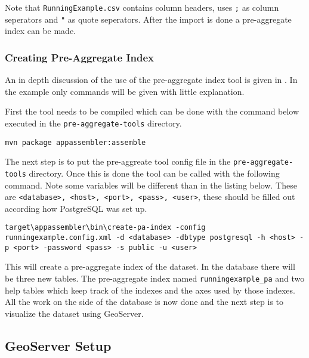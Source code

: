 Note that \lstinline|RunningExample.csv| contains column headers, uses \lstinline|;| as column seperators and \lstinline|"| as quote seperators. After the import is done a pre-aggregate index can be made.

\subsubsection{Creating Pre-Aggregate Index}
An in depth discussion of the use of the pre-aggregate index tool is given in . In the example only commands will be given with little explanation.

First the tool needs to be compiled which can be done with the command below executed in the \lstinline|pre-aggregate-tools| directory.
\begin{lstlisting}
mvn package appassembler:assemble
\end{lstlisting}
The next step is to put the pre-aggreate tool config file in the \lstinline|pre-aggregate-tools| directory. Once this is done the tool can be called with the following command. Note some variables will be different than in the listing below. These are \lstinline|<database>, <host>, <port>, <pass>, <user>|, these should be filled out according how PostgreSQL was set up.
\begin{lstlisting}
target\appassembler\bin\create-pa-index -config runningexample.config.xml -d <database> -dbtype postgresql -h <host> -p <port> -password <pass> -s public -u <user>
\end{lstlisting}
This will create a pre-aggregate index of the dataset. In the database there will be three new tables. The pre-aggregate index named \lstinline|runningexample_pa| and two help tables which keep track of the indexes and the axes used by those indexes. All the work on the side of the database is now done and the next step is to visualize the dataset using GeoServer.

\pagebreak
\subsection{GeoServer Setup}
